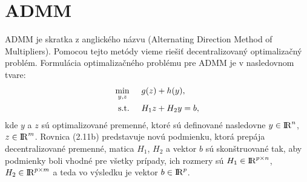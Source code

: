 \section{ADMM}
\label{subse:ADMM}
ADMM je skratka z anglického názvu (Alternating Direction Method of Multipliers). Pomocou tejto metódy vieme riešiť decentralizovaný optimalizačný problém.
Formulácia optimalizačného problému pre ADMM je v nasledovnom tvare:
\begin{subequations}
	\begin{align}
		\displaystyle \min_{y,z} \hspace{0.5cm} & 
		g(z) + h(y),\\
		\textrm{s.t.} \hspace{0.5cm} & H_{1}z + H_{2}y = b,
	\end{align}
\end{subequations}
kde $y$ a $z$ sú optimalizované premenné, ktoré sú definované nasledovne $y \in {\rm I\!R}^n $, $ z\in {\rm I\!R}^m$. Rovnica (2.11b) predstavuje novú podmienku, ktorá prepája decentralizované premenné, matica $H_{1}$, $H_{2}$ a vektor $b$ sú skonštruované tak, aby podmienky boli vhodné pre všetky prípady, ich rozmery sú $H_{1} \in {\rm I\!R}^{p \times n}$, $H_{2} \in {\rm I\!R}^{p \times m}$ a teda vo výsledku je vektor $b \in {\rm I\!R}^p $. 

